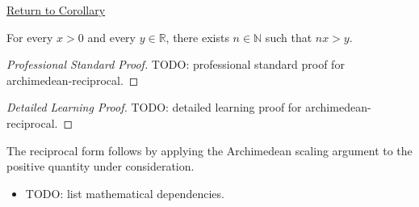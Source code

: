 \newpage
{}
\label{prf:archimedean-reciprocal}

\begin{remark*}[Return]
\hyperref[cor:archimedean-reciprocal]{Return to Corollary}
\end{remark*}

\begin{corollary*}
For every $x>0$ and every $y\in\mathbb{R}$, there exists $n\in\mathbb{N}$ such that $nx>y$.
\end{corollary*}

\begin{proof}[Professional Standard Proof]
\LRAProofBodyStart
TODO: professional standard proof for archimedean-reciprocal.
\end{proof}

\begin{proof}[Detailed Learning Proof]
\LRAProofBodyStart
TODO: detailed learning proof for archimedean-reciprocal.
\end{proof}

\begin{remark*}[Interpretation]
The reciprocal form follows by applying the Archimedean scaling argument to
the positive quantity under consideration.
\end{remark*}

\begin{remark*}
\end{remark*}

\begin{dependencies}
\begin{itemize}
  \item TODO: list mathematical dependencies.
\end{itemize}
\end{dependencies}

\clearpage
